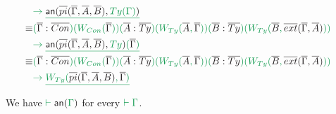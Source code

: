 \documentclass[12pt,headings=optiontohead,openany,oneside,a4paper]{book}
\theoremstyle{definition}
\newcommand{\gr}[1]{{\color{ForestGreen}#1}}
\newcommand{\grm}[1]{\ensuremath{\gr{#1}}}
\newcommand{\blm}[1]{\ensuremath{{\color{Black}#1}}}
\newcommand{\annotate}[1]{\blm{\mathsf{an}(\grm{#1})}}
\newcommand{\anntwo}[2]{\blm{\mathsf{an}(#1, \grm{#2})}}
\begin{document}
\begin{example}
\begin{align*}
{} \\
& \grm{
	\to \underline{\anntwo{\overline{pi}(\overline{\Gamma}, \overline{A}, \overline{B})}{\mathop{Ty}(\Gamma)}}
} \\
\equiv & \grm{
	(\blm{\overline{\Gamma} : \overline{Con}})(W_{\mathop{Con}}(\blm{\overline{\Gamma}}))
	(\blm{\overline{A} : \overline{Ty}})(W_{\mathop{Ty}}(\blm{\overline{A}}, \blm{\overline{\Gamma}}))
	(\blm{\overline{B} : \overline{Ty}})(W_{\mathop{Ty}}(\blm{\overline{B}}, \blm{\overline{ext}(\overline{\Gamma}, \overline{A})}))
} \\
& \grm{
	\to \underline{\anntwo{\overline{pi}(\overline{\Gamma}, \overline{A}, \overline{B})}{\mathop{Ty}}(\blm{\overline{\Gamma}})}
} \\
\equiv & \grm{
	(\blm{\overline{\Gamma} : \overline{Con}})(W_{\mathop{Con}}(\blm{\overline{\Gamma}}))
	(\blm{\overline{A} : \overline{Ty}})(W_{\mathop{Ty}}(\blm{\overline{A}}, \blm{\overline{\Gamma}}))
	(\blm{\overline{B} : \overline{Ty}})(W_{\mathop{Ty}}(\blm{\overline{B}}, \blm{\overline{ext}(\overline{\Gamma}, \overline{A})}))
} \\
& \grm{ \hspace*{0pt}\hfill
	\to \underline{W_{\mathop{Ty}}(\blm{\overline{pi}(\overline{\Gamma}, \overline{A}, \overline{B})},\blm{\overline{\Gamma}})}
} 
\end{align*}
\end{example}

\begin{lemma}
We have \grm{\vdash \annotate{\Gamma}} for every \grm{\vdash \Gamma}.
\end{lemma}
\end{document}
